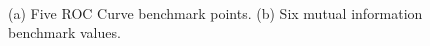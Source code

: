 \documentclass[11pt,letterpaper]{article}
\begin{document}
\begin{figure}
\centering
{}
$\quad$
\caption{(a) Five ROC Curve benchmark points.  (b) Six mutual information benchmark values.}
\end{figure}
\end{document}
